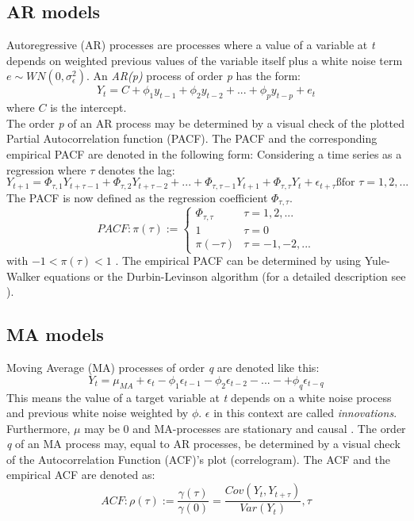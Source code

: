 \documentclass[a4paper, 11pt]{article}
\begin{document}
\subsection{AR models}
Autoregressive (AR) processes are processes where a value of a variable at \textit{t} depends on weighted previous values of the variable itself plus a white noise term $e \sim  WN(0, \sigma_{\epsilon}^2)$. An \textit{AR(p)} process of order \textit{p} has the form:
\begin{equation}
	Y_{t} = C + \phi_{1} y_{t-1} + \phi_{2} y_{t-2} + ... + \phi_{p} y_{t-p} +e_{t}
\end{equation}
where $C$ is the intercept.\\
The order \textit{p} of an AR process may be determined by a visual check of the plotted Partial Autocorrelation function (PACF). 
The PACF and the corresponding empirical PACF are denoted in the following form:
Considering a time series as a regression where $\tau$ denotes the lag:
\begin{equation}
Y_{t+1} = \Phi_{\tau,1}Y_{t+\tau-1} + \Phi_{\tau,2}Y_{t+\tau-2} + ... + \Phi_{\tau,\tau - 1}Y_{t+1} + \Phi_{\tau,\tau}Y_{t} + \epsilon_{t+\tau} ß \text{for $\tau = 1, 2, ...$}  
\end{equation}
The PACF is now defined as the regression coefficient $\Phi_{\tau,\tau}$.
\begin{equation}
PACF: \pi(\tau):= \begin{cases}
\Phi_{\tau,\tau} & \tau = 1, 2, ... \\
1 & \tau = 0 \\
\pi(-\tau) & \tau = -1, -2, ...
\end{cases}
\end{equation}
with 
$-1 < \pi(\tau) < 1$ \citep{Vogel.2015}. The empirical PACF can be determined by using Yule-Walker equations or the Durbin-Levinson algorithm (for a detailed description see \citep{Vogel.2015}).

\subsection{MA models}
Moving Average (MA) processes of order \textit{q} are denoted like this:
\begin{equation}
	Y_{t} = \mu_{MA} + \epsilon_{t} - \phi_{1}\epsilon_{t-1} - \phi_{2}\epsilon_{t-2} - ... - +\phi_{q}\epsilon_{t-q}
\end{equation}
This means the value of a target variable at \textit{t} depends on a white noise process and previous white noise weighted by $\phi$. $\epsilon$ in this context are called \textit{innovations}. Furthermore, $\mu$ may be 0 and MA-processes are stationary and causal \citep{Vogel.2015}.
The order \textit{q} of an MA process may, equal to AR processes, be determined by a visual check of the Autocorrelation Function (ACF)'s plot (correlogram). The ACF and the empirical ACF are denoted as:
\begin{equation}
ACF:	\rho(\tau) := \frac{\gamma(\tau)}{\gamma(0)} = \frac{Cov(Y_{t},Y_{t+\tau})}{Var(Y_{t})}, \tau \end{equation}
\end{document}
